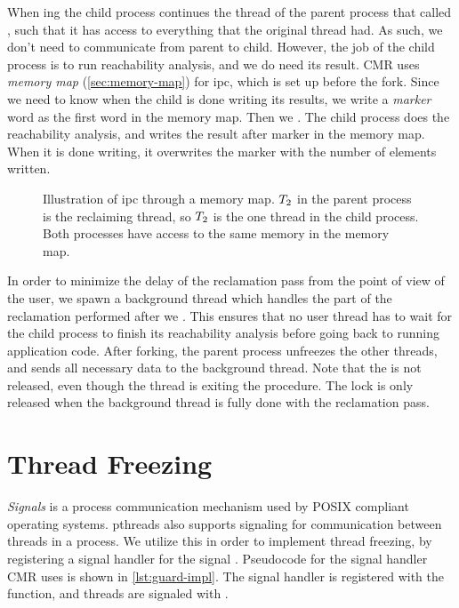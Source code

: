 When ing the child process continues the thread of the parent process that called
, such that it has access to everything that the original thread had.
As such, we don't need to communicate from parent to child. However, the job of the child process
is to run reachability analysis, and we do need its result. CMR uses \emph{memory map}
(\cref{sec:memory-map}) for \gls{ipc}\@, which is set up before the fork. Since we need to
know when the child is done writing its results, we write a \emph{marker} word as the first word in
the memory map. Then we . The child process does the reachability analysis, and
writes the result after marker in the memory map. When it is done writing, it overwrites the marker
with the number of elements written.

\begin{figure}[b]
  \centering
  
  \caption{Illustration of \gls{ipc} through a memory map. $T\sb{2}$ in the parent process is the
  reclaiming thread, so $T\sb{2}$ is the one thread in the child process. Both processes have
  access to the same memory in the memory map.}
\end{figure}

In order to minimize the delay of the reclamation pass from the point of view of the user, we spawn
a background thread which handles the part of the reclamation performed after we .
This ensures that no user thread has to wait for the child process to finish its reachability
analysis before going back to running application code.  After forking, the parent process
unfreezes the other threads, and sends all necessary data to the background thread. Note that the
 is not released, even though the thread is exiting the procedure. The lock is
only released when the background thread is fully done with the reclamation pass.

\section{Thread Freezing\label{sec:signals}}

\emph{Signals} is a process communication mechanism used by POSIX compliant operating systems.
\gls{pthreads} also supports signaling for communication between threads in a
process. We utilize this in order to implement thread freezing, by registering a signal handler for
the signal . Pseudocode for the signal handler CMR uses is shown in
\cref{lst:guard-impl}. The signal handler is registered with the 
function, and threads are signaled with .

